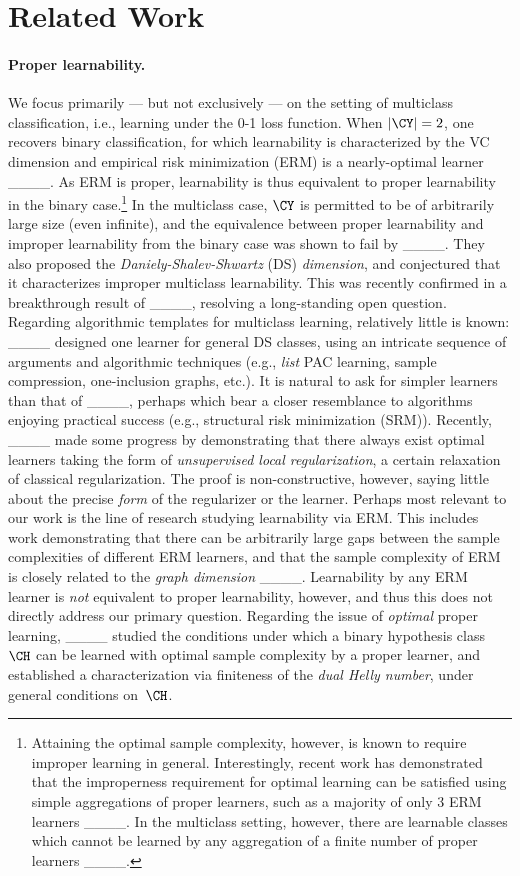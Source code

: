 \section{Related Work}
\paragraph{Proper learnability.} We focus primarily --- but not exclusively --- on the setting of multiclass classification, i.e., learning under the 0-1 loss function. When $|\CY| = 2$, one recovers binary classification, for which learnability is characterized by the VC dimension and empirical risk minimization (ERM) is a nearly-optimal learner ____.
As ERM is proper, learnability is thus equivalent to proper learnability in the binary case.\footnote{Attaining the optimal sample complexity, however, is known to require improper learning in general. Interestingly, recent work has demonstrated that the improperness requirement for optimal learning can be satisfied using simple aggregations of proper learners, such as a majority of only 3 ERM learners ____. In the multiclass setting, however, there are learnable classes which cannot be learned by any aggregation of a finite number of proper learners ____.} In the multiclass case, $\CY$ is permitted to be of arbitrarily large size (even infinite), and the equivalence between proper learnability and improper learnability from the binary case was shown to fail by ____. They also proposed the \emph{Daniely-Shalev-Shwartz} (DS) \emph{dimension}, and conjectured that it characterizes improper multiclass learnability. This was recently confirmed in a breakthrough result of ____, resolving a long-standing open question. Regarding algorithmic templates for multiclass learning, relatively little is known: ____ designed one learner for general DS classes, using an intricate sequence of arguments and algorithmic techniques (e.g., \emph{list} PAC learning, sample compression, one-inclusion graphs, etc.). It is natural to ask for simpler learners than that of ____, perhaps which bear a closer resemblance to algorithms enjoying practical success (e.g., structural risk minimization (SRM)). Recently, ____ made some progress by demonstrating that there always exist optimal learners taking the form of \emph{unsupervised local regularization}, a certain relaxation of classical regularization. The proof is non-constructive, however, saying little about the precise \emph{form} of the regularizer or the learner. Perhaps most relevant to our work is the line of research studying learnability via ERM. This includes work demonstrating that there can be arbitrarily large gaps between the sample complexities of different ERM learners, and that the sample complexity of ERM is closely related to the \emph{graph dimension} ____. Learnability by any ERM learner is \emph{not} equivalent to proper learnability, however, and thus this does not directly address our primary question. Regarding the issue of \emph{optimal} proper learning, ____ studied the conditions under which a binary hypothesis class $\CH$ can be learned with optimal sample complexity by a proper learner, and established a characterization via finiteness of the \emph{dual Helly number}, under general conditions on~$\CH$.  

